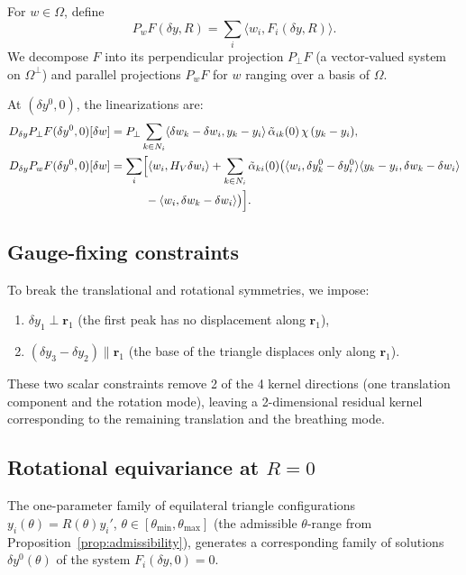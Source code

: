\documentclass[11pt]{article}
\theoremstyle{plain}%
\theoremstyle{definition}%
\theoremstyle{definition}%
\theoremstyle{remark}%
\numberwithin{equation}{section}
\newcommand{\HV}{H_V}
\newcommand{\ip}[2]{\langle #1, #2 \rangle}
\begin{document}
For $w\in\Omega$, define
\[
P_w F(\delta y,R) = \sum_i \ip{w_i}{F_i(\delta y,R)}.
\]
We decompose $F$ into its perpendicular projection $P_\perp F$ (a vector-valued system on $\Omega^\perp$) and parallel projections $P_w F$ for $w$ ranging over a basis of $\Omega$.

At $(\delta y^0,0)$, the linearizations are:
\begin{align}
D_{\delta y}P_\perp F(\delta y^0,0)[\delta w] &= P_\perp\sum_{k\in N_i}\ip{\delta w_k-\delta w_i}{y_k-y_i}\,\tilde{\alpha}_{ik}(0)\,\chi\,(y_k-y_i), \label{eq:DPperp} \\
D_{\delta y}P_w F(\delta y^0,0)[\delta w] &= \sum_i\Bigl[\ip{w_i}{\HV\delta w_i} + \sum_{k\in N_i}\tilde{\alpha}_{ki}(0)\bigl(\ip{w_i}{\delta y_k^0-\delta y_i^0}\ip{y_k-y_i}{\delta w_k-\delta w_i} \notag \\
&\quad\qquad - \ip{w_i}{\delta w_k-\delta w_i}\bigr)\Bigr]. \label{eq:DPpar}
\end{align}


\subsection{Gauge-fixing constraints}\label{subsec:gauge-fix}

To break the translational and rotational symmetries, we impose:
\begin{enumerate}
\item[(G1)] $\delta y_1\perp\boldsymbol{r}_1$ (the first peak has no displacement along $\boldsymbol{r}_1$),
\item[(G2)] $(\delta y_3-\delta y_2)\parallel\boldsymbol{r}_1$ (the base of the triangle displaces only along $\boldsymbol{r}_1$).
\end{enumerate}
These two scalar constraints remove 2 of the 4 kernel directions (one translation component and the rotation mode), leaving a 2-dimensional residual kernel corresponding to the remaining translation and the breathing mode.


\subsection{Rotational equivariance at $R=0$}\label{subsec:equivariance}

\begin{prop}[Family structure at $R=0$]\label{prop:family}
The one-parameter family of equilateral triangle configurations $y_i(\theta)=R(\theta)y_i'$, $\theta\in[\theta_{\min},\theta_{\max}]$ (the admissible $\theta$-range from Proposition~\ref{prop:admissibility}), generates a corresponding family of solutions $\delta y^0(\theta)$ of the system $F_i(\delta y,0)=0$.
\end{prop}
\end{document}
